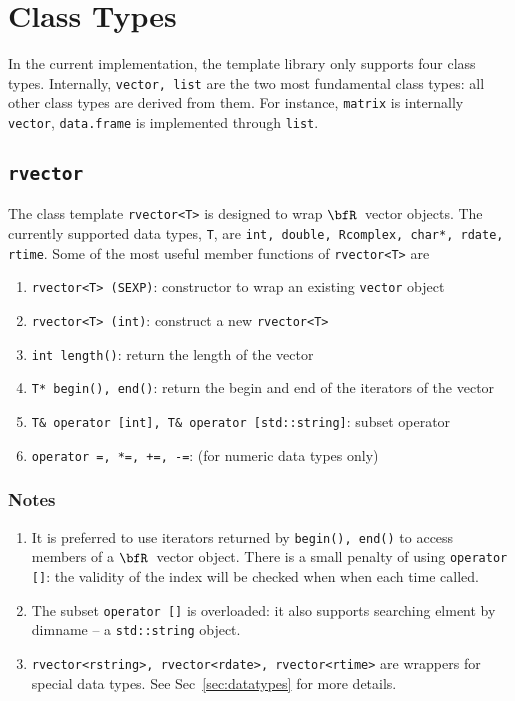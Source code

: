\documentclass{article}
\newcommand{\R}{$\bfR$}
\begin{document}
\section{Class Types}\label{sec:classtypes}

In the current implementation, the template library only
supports four class types. Internally, \texttt{vector, list}
are the two most fundamental class types: all other class
types are derived from them. For instance, \texttt{matrix} is
internally \texttt{vector}, \texttt{data.frame} is
implemented through \texttt{list}.

\subsection{\texttt{rvector}}

The class template \texttt{rvector<T>} is designed to wrap
\R\ vector objects. The currently supported data types,
\texttt{T}, are \texttt{int, double, Rcomplex, char*, rdate,
rtime}.  Some of the most useful member functions of
\texttt{rvector<T>} are
\begin{enumerate}
  \item \texttt{rvector<T> (SEXP)}: constructor to wrap an
    existing \texttt{vector} object
  \item \texttt{rvector<T> (int)}: construct a new
    \texttt{rvector<T>}
  \item \texttt{int length()}: return the length of the
    vector
  \item \texttt{T* begin(), end()}: return the begin and end
    of the iterators of the vector
  \item \texttt{T\& operator [int], T\& operator [std::string]}: subset operator
  \item \texttt{operator =, *=, +=, -=}: (for numeric data
    types only)
\end{enumerate}

\subsubsection*{Notes}

\begin{enumerate}
  \item It is preferred to use iterators returned by
    \texttt{begin(), end()} to access members of a \R\ vector
    object. There is a small penalty of using
    \texttt{operator []}: the validity of the index will be
    checked when when each time called.
  \item The subset \texttt{operator []} is overloaded: it
    also supports searching elment by dimname -- a
    \texttt{std::string} object.
  \item \texttt{rvector<rstring>, rvector<rdate>,
    rvector<rtime>} are wrappers for special data types. See
    Sec~\ref{sec:datatypes} for more details.
\end{enumerate}
\end{document}
